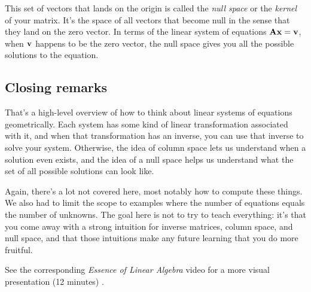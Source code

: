 This set of vectors that lands on the origin is called the \textit{null space}
or the \textit{kernel} of your matrix. It's the space of all vectors that become
null in the sense that they land on the zero vector. In terms of the linear
system of equations $\mathbf{A}\mathbf{x} = \mathbf{v}$, when $\mathbf{v}$ happens to be the
zero vector, the null space gives you all the possible solutions to the
equation.

\subsection{Closing remarks}

That's a high-level overview of how to think about linear systems of equations
geometrically. Each system has some kind of linear transformation associated
with it, and when that transformation has an inverse, you can use that inverse
to solve your system. Otherwise, the idea of column space lets us understand
when a solution even exists, and the idea of a null space helps us understand
what the set of all possible solutions can look like.

Again, there's a lot not covered here, most notably how to compute these things.
We also had to limit the scope to examples where the number of equations equals
the number of unknowns. The goal here is not to try to teach everything: it's
that you come away with a strong intuition for inverse matrices, column space,
and null space, and that those intuitions make any future learning that you do
more fruitful.

\begin{remark}
  See the corresponding \textit{Essence of Linear Algebra} video for a more
  visual presentation (12 minutes)
  \cite{bib:linalg_inverse_matrices_column_space_and_null_space}.
\end{remark}
